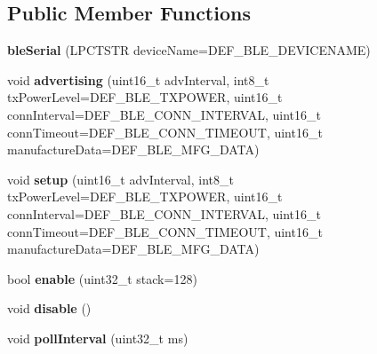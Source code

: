 \subsection*{Public Member Functions}
\begin{DoxyCompactItemize}
\item 
\hypertarget{classble_serial_a835c884c9209b074cf82e5a3f0a322ec}{{\bfseries ble\-Serial} (L\-P\-C\-T\-S\-T\-R device\-Name=D\-E\-F\-\_\-\-B\-L\-E\-\_\-\-D\-E\-V\-I\-C\-E\-N\-A\-M\-E)}\label{classble_serial_a835c884c9209b074cf82e5a3f0a322ec}

\item 
\hypertarget{classble_serial_a0ee4ea2d6d4a38bbd64968336f85c2e9}{void {\bfseries advertising} (uint16\-\_\-t adv\-Interval, int8\-\_\-t tx\-Power\-Level=D\-E\-F\-\_\-\-B\-L\-E\-\_\-\-T\-X\-P\-O\-W\-E\-R, uint16\-\_\-t conn\-Interval=D\-E\-F\-\_\-\-B\-L\-E\-\_\-\-C\-O\-N\-N\-\_\-\-I\-N\-T\-E\-R\-V\-A\-L, uint16\-\_\-t conn\-Timeout=D\-E\-F\-\_\-\-B\-L\-E\-\_\-\-C\-O\-N\-N\-\_\-\-T\-I\-M\-E\-O\-U\-T, uint16\-\_\-t manufacture\-Data=D\-E\-F\-\_\-\-B\-L\-E\-\_\-\-M\-F\-G\-\_\-\-D\-A\-T\-A)}\label{classble_serial_a0ee4ea2d6d4a38bbd64968336f85c2e9}

\item 
\hypertarget{classble_serial_acc1e214474c9e98705fb7f363a3eee74}{void {\bfseries setup} (uint16\-\_\-t adv\-Interval, int8\-\_\-t tx\-Power\-Level=D\-E\-F\-\_\-\-B\-L\-E\-\_\-\-T\-X\-P\-O\-W\-E\-R, uint16\-\_\-t conn\-Interval=D\-E\-F\-\_\-\-B\-L\-E\-\_\-\-C\-O\-N\-N\-\_\-\-I\-N\-T\-E\-R\-V\-A\-L, uint16\-\_\-t conn\-Timeout=D\-E\-F\-\_\-\-B\-L\-E\-\_\-\-C\-O\-N\-N\-\_\-\-T\-I\-M\-E\-O\-U\-T, uint16\-\_\-t manufacture\-Data=D\-E\-F\-\_\-\-B\-L\-E\-\_\-\-M\-F\-G\-\_\-\-D\-A\-T\-A)}\label{classble_serial_acc1e214474c9e98705fb7f363a3eee74}

\item 
\hypertarget{classble_serial_a3ff1e4b271a7d225e73abd337043d8e4}{bool {\bfseries enable} (uint32\-\_\-t stack=128)}\label{classble_serial_a3ff1e4b271a7d225e73abd337043d8e4}

\item 
\hypertarget{classble_serial_a08b3a82e95aa527433c04b4a6a3d81d4}{void {\bfseries disable} ()}\label{classble_serial_a08b3a82e95aa527433c04b4a6a3d81d4}

\item 
\hypertarget{classble_serial_a4188fc1bab7e077cf1d573024f092c7b}{void {\bfseries poll\-Interval} (uint32\-\_\-t ms)}\label{classble_serial_a4188fc1bab7e077cf1d573024f092c7b}


\end{DoxyCompactItemize}
